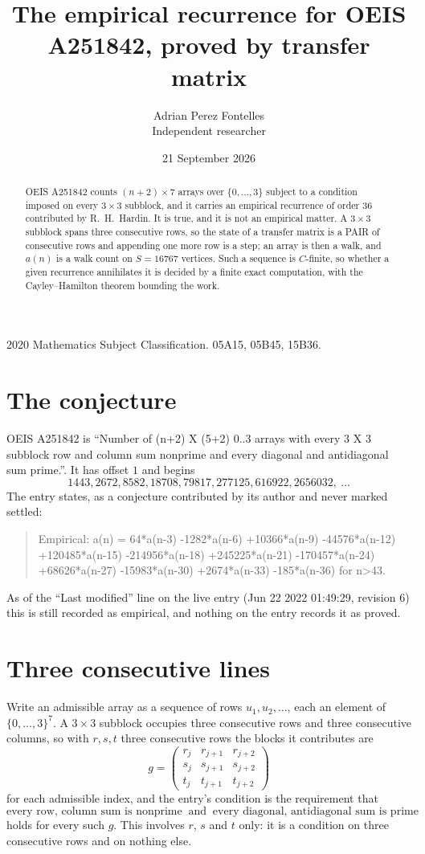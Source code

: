 \documentclass[11pt,a4paper]{article}
\title{The empirical recurrence for OEIS A251842, proved by transfer matrix}
\author{Adrian Perez Fontelles\\ \small Independent researcher}
\date{21 September 2026}
\theoremstyle{plain}
\theoremstyle{definition}
\begin{document}
\maketitle

\begin{abstract}
OEIS A251842 counts $(n+2)\times7$ arrays over $\{0,\dots,3\}$ subject to a condition imposed on
every $3\times3$ subblock, and it carries an empirical recurrence of order $36$
contributed by R.~H.~Hardin. It is true, and it is not an empirical matter. A $3\times3$
subblock spans three consecutive rows, so the state of a transfer matrix is a PAIR of
consecutive rows and appending one more row is a step; an array is then a walk, and
$a(n)$ is a walk count on $S=16767$ vertices. Such a sequence is $C$-finite, so whether a given
recurrence annihilates it is decided by a finite exact computation, with the Cayley--Hamilton
theorem bounding the work.
\end{abstract}

\noindent\small 2020 Mathematics Subject Classification. 05A15, 05B45, 15B36.\normalsize

\section{The conjecture}

OEIS A251842 is ``Number of (n+2) X (5+2) 0..3 arrays with every 3 X 3 subblock row and column sum nonprime and every diagonal and antidiagonal sum prime.''. It has offset $1$ and begins
\[
1443, 2672, 8582, 18708, 79817, 277125, 616922, 2656032,\ \dots
\]
The entry states, as a conjecture contributed by its author and never marked settled:
\begin{quote}
Empirical: a(n) = 64*a(n-3) -1282*a(n-6) +10366*a(n-9) -44576*a(n-12) +120485*a(n-15) -214956*a(n-18) +245225*a(n-21) -170457*a(n-24) +68626*a(n-27) -15983*a(n-30) +2674*a(n-33) -185*a(n-36) for n>43.
\end{quote}
As of the ``Last modified'' line on the live entry (Jun 22 2022 01:49:29, revision 6) this is still
recorded as empirical, and nothing on the entry records it as proved.

\section{Three consecutive lines}

Write an admissible array as a sequence of rows $u_1,u_2,\dots$, each an element of
$\{0,\dots,3\}^{7}$. A $3\times3$ subblock occupies three consecutive rows and
three consecutive columns, so with $r,s,t$ three consecutive rows the blocks it
contributes are
\[
g=\begin{pmatrix}r_j&r_{j+1}&r_{j+2}\\ s_j&s_{j+1}&s_{j+2}\\ t_j&t_{j+1}&t_{j+2}\end{pmatrix}
\]
for each admissible index, and the entry's condition is the requirement that
\[
\text{every row, column sum is nonprime}\ \text{ and }\ \text{every diagonal, antidiagonal sum is prime}
\]
holds for every such $g$. This involves $r$, $s$ and $t$ only: it is a condition on
three consecutive rows and on nothing else.
\end{document}
